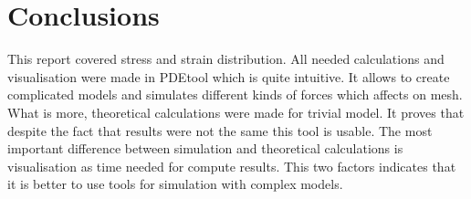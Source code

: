 \documentclass[a4paper,12pt]{article}
\begin{document}
\section{Conclusions}

This report covered stress and strain distribution. All needed calculations and visualisation were made in PDEtool which is quite intuitive. It allows to create complicated models and simulates different kinds of forces which affects on mesh. What is more, theoretical calculations were made for trivial model. It proves that despite the fact that results were not the same this tool is usable. The most important difference between simulation and theoretical calculations is visualisation as time needed for compute results. This two factors indicates that it is better to use tools for simulation with complex models.
\end{document}
